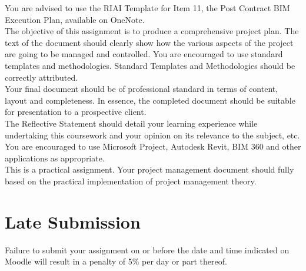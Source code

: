You are advised to use the RIAI Template for Item 11, the Post Contract BIM Execution Plan, available on OneNote.\\

The objective of this assignment is to produce a comprehensive project plan. The text of the document should clearly show how the various aspects of the project are going to be managed and controlled. You are encouraged to use standard templates and methodologies.  Standard Templates and Methodologies should be correctly attributed.\\

Your final document should be of professional standard in terms of content, layout and completeness. In essence, the completed document should be suitable for presentation to a prospective client.\\

The Reflective Statement should detail your learning experience while undertaking this coursework and your opinion on its relevance to the subject, etc.\\

You are encouraged to use Microsoft Project, Autodesk Revit, BIM 360 and other applications as appropriate.\\

This is a practical assignment. Your project management document should fully based on the practical implementation of project management theory.\\


\section*{Late Submission}
Failure to submit your assignment on or before the date and time indicated on Moodle will result in a penalty of 5\% per day or part thereof.


\newpage

